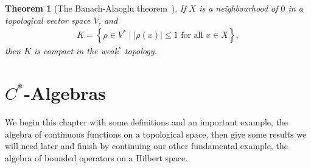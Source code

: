 \documentclass[11pt,a4paper]{report}
\theoremstyle{plain}
\newtheorem*{thm*}{Theorem}
\theoremstyle{definition}
\newcommand{\1}{\mathbbm{1}}
\begin{document}
\begin{thm*}[{The Banach-Alaoglu theorem~\cite{rudin91}}]
	If $X$ is a neighbourhood of $0$ in a topological vector space $V$, and
	\begin{align*}
		K=\left\{\rho\in V^\ast \mid |\rho(x)|\leq 1 \mbox{ for all } x \in X \right\},
	\end{align*}
	then $K$ is compact in the weak$^\ast$ topology.
\end{thm*}

\chapter{$C^\ast$-Algebras} \label{chapter:cstar}
We begin this chapter with some definitions and an important example, the 
algebra of continuous functions on a topological space, then give some results 
we will need later and finish by continuing our other fundamental example, the 
algebra of bounded operators on a Hilbert space.
\end{document}
